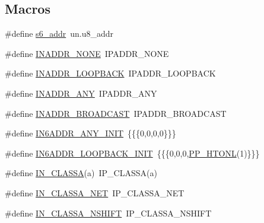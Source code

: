 \subsection*{Macros}
\begin{DoxyCompactItemize}
\item 
\#define \hyperlink{openmote-cc2538_2lwip_2src_2include_2lwip_2inet_8h_ac7f92897f00d3373bf818709dfb0724a}{s6\+\_\+addr}~un.\+u8\+\_\+addr
\item 
\#define \hyperlink{openmote-cc2538_2lwip_2src_2include_2lwip_2inet_8h_a3d2472d6cf31b73eeb829110dd0fffea}{I\+N\+A\+D\+D\+R\+\_\+\+N\+O\+NE}~I\+P\+A\+D\+D\+R\+\_\+\+N\+O\+NE
\item 
\#define \hyperlink{openmote-cc2538_2lwip_2src_2include_2lwip_2inet_8h_ae1ac25d7797666cff6d01d6c795c2378}{I\+N\+A\+D\+D\+R\+\_\+\+L\+O\+O\+P\+B\+A\+CK}~I\+P\+A\+D\+D\+R\+\_\+\+L\+O\+O\+P\+B\+A\+CK
\item 
\#define \hyperlink{openmote-cc2538_2lwip_2src_2include_2lwip_2inet_8h_a5d1940045dc2e7de552f3d4ff13a74ab}{I\+N\+A\+D\+D\+R\+\_\+\+A\+NY}~I\+P\+A\+D\+D\+R\+\_\+\+A\+NY
\item 
\#define \hyperlink{openmote-cc2538_2lwip_2src_2include_2lwip_2inet_8h_a4a725f61ded23ce8a7dff8e82ed51986}{I\+N\+A\+D\+D\+R\+\_\+\+B\+R\+O\+A\+D\+C\+A\+ST}~I\+P\+A\+D\+D\+R\+\_\+\+B\+R\+O\+A\+D\+C\+A\+ST
\item 
\#define \hyperlink{openmote-cc2538_2lwip_2src_2include_2lwip_2inet_8h_a1de876a356ee05a2e9427b741f99f49c}{I\+N6\+A\+D\+D\+R\+\_\+\+A\+N\+Y\+\_\+\+I\+N\+IT}~\{\{\{0,0,0,0\}\}\}
\item 
\#define \hyperlink{openmote-cc2538_2lwip_2src_2include_2lwip_2inet_8h_a5562c81af19ee5988ddc5a5c6153cf37}{I\+N6\+A\+D\+D\+R\+\_\+\+L\+O\+O\+P\+B\+A\+C\+K\+\_\+\+I\+N\+IT}~\{\{\{0,0,0,\hyperlink{openmote-cc2538_2lwip_2src_2include_2lwip_2def_8h_afea9c21aa1f56180cdf6fb42ef14a294}{P\+P\+\_\+\+H\+T\+O\+NL}(1)\}\}\}
\item 
\#define \hyperlink{openmote-cc2538_2lwip_2src_2include_2lwip_2inet_8h_a1e47e367a806b409613e165212c3e019}{I\+N\+\_\+\+C\+L\+A\+S\+SA}(a)~I\+P\+\_\+\+C\+L\+A\+S\+SA(a)
\item 
\#define \hyperlink{openmote-cc2538_2lwip_2src_2include_2lwip_2inet_8h_a615c805e78c867afb51fa883d6b8301c}{I\+N\+\_\+\+C\+L\+A\+S\+S\+A\+\_\+\+N\+ET}~I\+P\+\_\+\+C\+L\+A\+S\+S\+A\+\_\+\+N\+ET
\item 
\#define \hyperlink{openmote-cc2538_2lwip_2src_2include_2lwip_2inet_8h_a7517815cda63a519a06841d67ee2326b}{I\+N\+\_\+\+C\+L\+A\+S\+S\+A\+\_\+\+N\+S\+H\+I\+FT}~I\+P\+\_\+\+C\+L\+A\+S\+S\+A\+\_\+\+N\+S\+H\+I\+FT

\end{DoxyCompactItemize}
